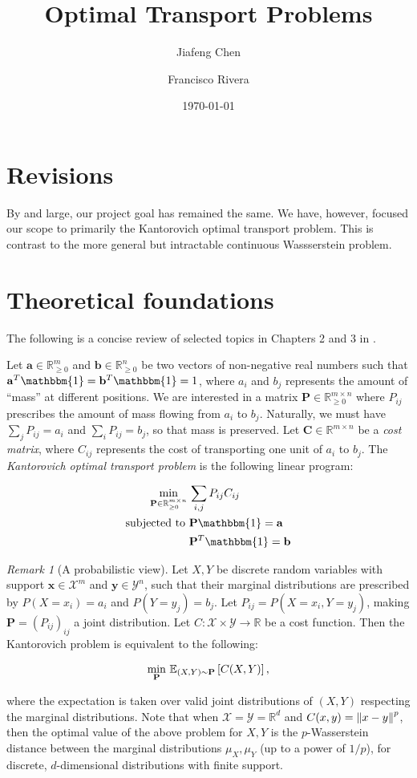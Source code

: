 \documentclass[11pt,reqno]{amsart}
\title{Optimal Transport Problems}
\author{Jiafeng Chen\and Francisco Rivera}
\date{\today}
\renewcommand{\b}{\mathbf}
\newcommand{\R}{\mathbb{R}}
\newcommand{\one}{\mathbbm{1}}
\newcommand{\E}{\mathbb{E}}
\theoremstyle{definition}
\theoremstyle{remark}
\newtheorem{rmk}{Remark}
\begin{document}
\maketitle

\section{Revisions}

By and large, our project goal has remained the same. We have, however, focused
our scope to primarily the Kantorovich optimal transport problem. This is
contrast to the more general but intractable continuous Wassserstein problem.

\section{Theoretical foundations}
The following is a concise review of selected topics in Chapters 2 and 3 in
\cite{peyre2017computational}.

Let $\b a \in \R^m_{\ge 0}$ and $\b b \in \R^n_{\ge 0}$ be two vectors of
non-negative real numbers such that $\b a^T \one = \b b^T \one = 1$, where $a_i$
and $b_j$ represents the amount of ``mass'' at different positions. We are
interested in a matrix $\b P \in \R^{m \times n}_{\ge 0}$ where $P_{ij}$
prescribes the amount of mass flowing from $a_i$ to $b_j$. Naturally, we must
have $\sum_j P_{ij} = a_i$ and $\sum_i P_{ij} = b_j$, so that mass is preserved.
Let $\b C \in \R^{m\times n}$ be a \emph{cost matrix}, where $C_{ij}$ represents
the cost of transporting one unit of $a_i$ to $b_j$. The \emph{Kantorovich
optimal transport problem} is the following linear program:

\begin{align*}
\min_{\b P \in \R^{m \times n}_{\ge 0}} \, & \sum_{i,j} P_{ij} C_{ij} \\
\text{subjected to } & \b P \one = \b a \\
& \b P^T \one = \b b
\end{align*}

\begin{rmk}[A probabilistic view]
Let $X,Y$ be discrete random variables with support $\b x \in \mathcal X^m$ and
$\b y \in \mathcal Y^n$, such that their marginal distributions are prescribed
by $P(X = x_i) = a_i$ and $P(Y = y_j) = b_j$. Let $P_{ij} = P(X = x_i, Y =
y_j)$, making $\b P = (P_{ij})_ {ij}$ a joint distribution. Let $C: \mathcal X
\times \mathcal Y \to \R$ be a cost function. Then the Kantorovich problem is
equivalent to the following:

\[ \min_{\b P}\, \E_{(X,Y) \sim \b P}\bk{C(X,Y)}, \]

where the expectation is taken over valid joint distributions of $(X,Y)$
respecting the marginal distributions. Note that when $\mathcal X = \mathcal Y =
\R^d$ and $C(x,y) = \left\lVert x-y\right\rVert^p$, then the optimal value of the above problem
for $X,Y$ is the $p$-Wasserstein distance between the marginal distributions
$\mu_X,\mu_Y$ (up to a power of $1/p$), for discrete, $d$-dimensional
distributions with finite support.
\end{rmk}
\end{document}
